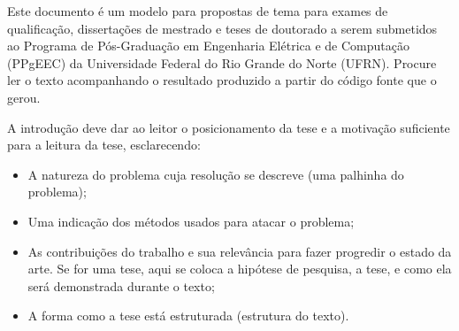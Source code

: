 
\label{Cap:Introducao}

Este documento é um modelo para propostas de tema para exames de
qualificação, dissertações de mestrado e teses de doutorado a serem
submetidos ao Programa de Pós-Graduação em Engenharia Elétrica e de Computação (PPgEEC)
da Universidade Federal do Rio Grande do Norte (UFRN).  Procure ler o
texto acompanhando o resultado produzido a partir do código fonte que
o gerou.

A introdução deve dar ao leitor o posicionamento da tese e a motivação suficiente para a leitura da tese, esclarecendo:
\begin{itemize}
	\item A natureza do problema cuja resolução se descreve (uma palhinha do problema);
	\item Uma indicação dos métodos usados para atacar o problema;
	\item As contribuições do trabalho e sua relevância para fazer progredir o estado da arte. Se for uma tese, aqui se coloca a hipótese de pesquisa, a tese, e como ela será demonstrada durante o texto;
	\item A forma como a tese está estruturada (estrutura do texto).
\end{itemize}


